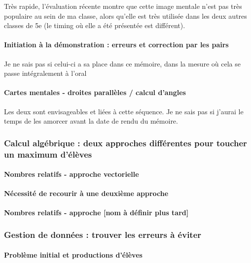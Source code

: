 Très rapide, l'évaluation récente montre que cette image mentale n'est pas très populaire au sein de ma classe, alors qu'elle est très utilisée dans les deux autres classes de 5e (le timing où elle a été présentée est différent).

\paragraph{Initiation à la démonstration : erreurs et correction par les pairs}

{\color{red} Je ne sais pas si celui-ci a sa place dans ce mémoire, dans la mesure où cela se passe intégralement à l'oral}

\paragraph{Cartes mentales - droites parallèles / calcul d'angles}

Les deux sont envisageables et liées à cette séquence. {\color{red}Je ne sais pas si j'aurai le temps de les amorcer avant la date de rendu du mémoire.}

\subsubsection{Calcul algébrique : deux approches différentes pour toucher un maximum d'élèves}

\paragraph{Nombres relatifs - approche vectorielle}

\paragraph{Nécessité de recourir à une deuxième approche}

\paragraph{Nombres relatifs - approche [nom à définir plus tard]}

\subsubsection{Gestion de données : trouver les erreurs à éviter}

\paragraph{Problème initial et productions d'élèves}

